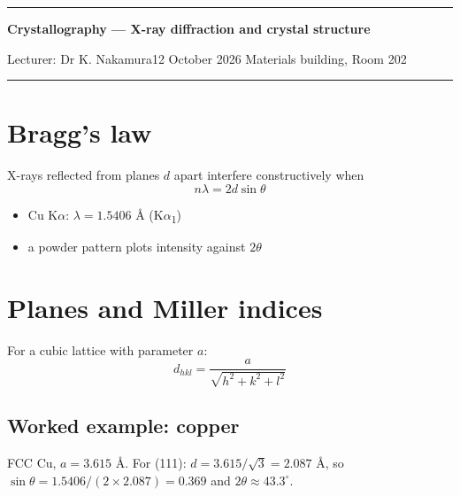 \documentclass[11pt]{article}
\newcommand\knotetime[1]{\leavevmode\llap{\color{knotemuted}\scriptsize #1\hspace{1em}}}
\newenvironment{knotechunk}{}{}
\begin{document}
\begin{knotechunk}
{\color{knoteaccent}\rule{\linewidth}{1.5pt}}\par
{\LARGE\bfseries Crystallography — X-ray diffraction and crystal structure}\par
{\large Lecturer: Dr K. Nakamura}\hfill{\color{knotemuted}12 October 2026 \textperiodcentered{} Materials building, Room 202}\par
{\color{knoteaccent}\rule{\linewidth}{0.6pt}}\par

\section{Bragg's law}

\knotetime{01:25}X-rays reflected from planes $d$ apart interfere constructively when \[n\lambda = 2d\sin\theta\]

\begin{itemize}\setlength{\itemsep}{0pt}\setlength{\parskip}{0pt}
  \item Cu K\ensuremath{\alpha}: $\lambda = 1.5406$ Å (K\ensuremath{\alpha}\textsubscript{1})
  \item a powder pattern plots intensity against $2\theta$
\end{itemize}
\end{knotechunk}

\begin{knotechunk}
\section{Planes and Miller indices}

\knotetime{08:25}For a cubic lattice with parameter $a$: \[d_{hkl} = \frac{a}{\sqrt{h^2 + k^2 + l^2}}\]

\subsection{Worked example: copper}

\knotetime{09:15}FCC Cu, $a = 3.615$ Å. For (111): $d = 3.615/\sqrt{3} = 2.087$ Å, so $\sin\theta = 1.5406/(2\times2.087) = 0.369$ and $2\theta \approx 43.3^{\circ}$.
\end{knotechunk}
\end{document}
